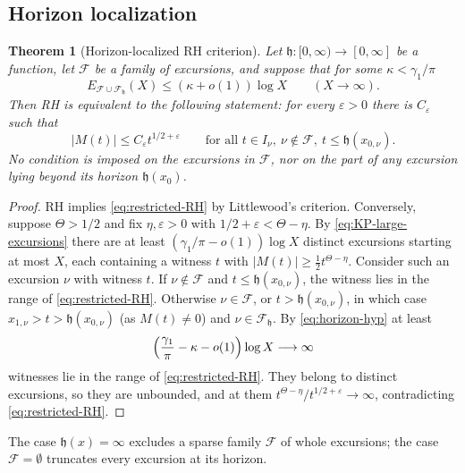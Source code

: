 \documentclass[11pt]{amsart}
\numberwithin{equation}{section}
\theoremstyle{plain}
\newtheorem{theorem}{Theorem}[section]
\theoremstyle{definition}
\theoremstyle{remark}
\newcommand{\eps}{\varepsilon}
\newcommand{\F}{\mathcal{F}}
\begin{document}
\subsection{Horizon localization}
\label{subsec:horizon}

\begin{theorem}[Horizon-localized RH criterion]
\label{thm:horizon}
\label{thm:sparse-RH}
Let $\mathfrak h:[0,\infty)\to[0,\infty]$ be a function, let $\F$ be a family
of excursions, and suppose that for some $\kappa<\gamma_1/\pi$
\begin{equation}
\label{eq:horizon-hyp}
E_{\F\cup\F_{\mathfrak h}}(X)\le(\kappa+o(1))\log X\qquad(X\to\infty).
\end{equation}
Then RH is equivalent to the following statement: for every $\eps>0$ there
is $C_\eps$ such that
\begin{equation}
\label{eq:restricted-RH}
|M(t)|\le C_\eps t^{1/2+\eps}
\qquad\text{for all }t\in I_\nu,\ \nu\notin\F,\ t\le \mathfrak h(x_{0,\nu}).
\end{equation}
No condition is imposed on the excursions in $\F$, nor on the part of any
excursion lying beyond its horizon $\mathfrak h(x_0)$.
\end{theorem}

\begin{proof}
RH implies \eqref{eq:restricted-RH} by Littlewood's criterion. Conversely,
suppose $\Theta>1/2$ and fix $\eta,\eps>0$ with
$1/2+\eps<\Theta-\eta$. By \eqref{eq:KP-large-excursions} there are at least
$(\gamma_1/\pi-o(1))\log X$ distinct excursions starting at most $X$, each
containing a witness $t$ with $|M(t)|\ge\frac12t^{\Theta-\eta}$. Consider
such an excursion $\nu$ with witness $t$. If $\nu\notin\F$ and
$t\le \mathfrak h(x_{0,\nu})$, the witness lies in the range of
\eqref{eq:restricted-RH}. Otherwise $\nu\in\F$, or $t>\mathfrak h(x_{0,\nu})$, in
which case $x_{1,\nu}>t>\mathfrak h(x_{0,\nu})$ (as $M(t)\ne0$) and $\nu\in\F_{\mathfrak h}$. By
\eqref{eq:horizon-hyp} at least
\[
\Bigl(\frac{\gamma_1}{\pi}-\kappa-o(1)\Bigr)\log X\longrightarrow\infty
\]
witnesses lie in the range of \eqref{eq:restricted-RH}. They belong to
distinct excursions, so they are unbounded, and at them
$t^{\Theta-\eta}/t^{1/2+\eps}\to\infty$, contradicting
\eqref{eq:restricted-RH}.
\end{proof}

The case $\mathfrak h(x)=\infty$ excludes a sparse family $\F$ of whole excursions;
the case $\F=\emptyset$ truncates every excursion at its horizon.
\end{document}
